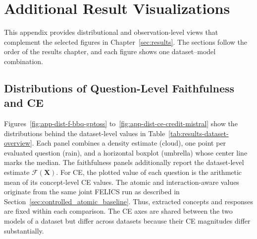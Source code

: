 \chapter{Additional Result Visualizations}
\label{app:additional-result-visualizations}






This appendix provides distributional and observation-level views that complement the selected figures in Chapter~\ref{sec:results}. The sections follow the order of the results chapter, and each figure shows one dataset--model combination.

\section{Distributions of Question-Level Faithfulness and CE}
\label{app:distributions}

Figures~\ref{fig:app-dist-f-bbq-gptoss} to~\ref{fig:app-dist-ce-credit-mistral} show the distributions behind the dataset-level values in Table~\ref{tab:results-dataset-overview}. Each panel combines a density estimate (cloud), one point per evaluated question (rain), and a horizontal boxplot (umbrella) whose center line marks the median. The faithfulness panels additionally report the dataset-level estimate $\mathcal{F}(\mathbf{X})$. For CE, the plotted value of each question is the arithmetic mean of its concept-level CE values. The atomic and interaction-aware values originate from the same joint FELICS run as described in Section~\ref{sec:controlled_atomic_baseline}. Thus, extracted concepts and responses are fixed within each comparison. The CE axes are shared between the two models of a dataset but differ across datasets because their CE magnitudes differ substantially.

\ifthesislocalbuild
  
  
  \tikzexternalenable

  \newcommand{\AppendixDistributionFigure}[8]{%
    \begin{figure}[H]
      \centering
      \ResultFigureHalf{%
        \FaithfulnessRaincloudPanel{data/summary/question_level_faithfulness_#4.csv}{#5}}%
        {Question-level faithfulness for #1 with #2}%
        {Question-level faithfulness for #1 with #2 under atomic and joint attribution.}%
        {fig:app-dist-f-#5}%
      \hfill
      \ResultFigureHalf{%
        \CeRaincloudPanel{data/appendix/ce_shifts/#3.csv}{#5}{#6}{#7}{#8}}%
        {Question-averaged CE for #1 with #2}%
        {Question-averaged CE for #1 with #2 under atomic and joint attribution.}%
        {fig:app-dist-ce-#5}%
    \end{figure}%
  }

